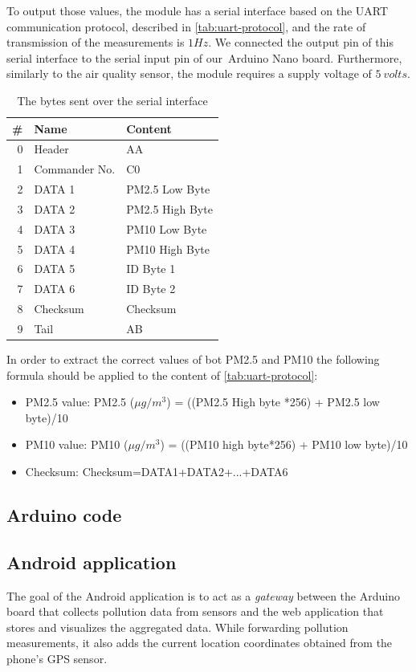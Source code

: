 \documentclass[12pt]{article}
\begin{document}
  To output those values, the module has a serial interface based on the UART communication protocol, described in \autoref{tab:uart-protocol}, and the rate of transmission of the measurements is $1Hz$. We connected the output pin of this serial interface to the serial input pin of our Arduino Nano board. Furthermore, similarly to the air quality sensor, the module requires a supply voltage of $5\ volts$.

  \begin{table}[H]
    \centering
    \begin{tabular}{r | l | l}
      \# & Name & Content\\\toprule
      0 & Header & AA\\
      1 & Commander No. & C0\\
      2 & DATA 1 & PM2.5 Low Byte\\
      3 & DATA 2 & PM2.5 High Byte\\
      4 & DATA 3 & PM10 Low Byte\\
      5 & DATA 4 & PM10 High Byte\\
      6 & DATA 5 & ID Byte 1\\
      7 & DATA 6 & ID Byte 2\\
      8 & Checksum & Checksum\\
      9 & Tail & AB\\
    \end{tabular}
    \caption{The bytes sent over the serial interface}
    \label{tab:uart-protocol}
  \end{table}

  In order to extract the correct values of bot PM2.5 and PM10 the following formula should be applied to the content of \autoref{tab:uart-protocol}:

  \begin{itemize}
    \item PM2.5 value: PM2.5 ($\mu g/m^3$)  =  ((PM2.5  High  byte  *256)  +  PM2.5 low byte)/10
    \item PM10 value: PM10 ($\mu g/m^3$)  =  ((PM10  high  byte*256)  +  PM10  low byte)/10
    \item Checksum: Checksum=DATA1+DATA2+...+DATA6
  \end{itemize}

  \subsection{Arduino code}

  \subsection{Android application}
  The goal of the Android application is to act as a \textit{gateway} between the Arduino board that collects pollution data from sensors and the web application that stores and visualizes the aggregated data. While forwarding pollution measurements, it also adds the current location coordinates obtained from the phone's GPS sensor.
\end{document}
